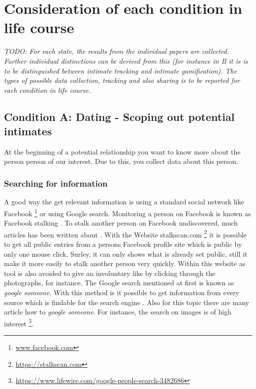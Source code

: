 \section{Consideration of each condition in life course}
\label{sec:consideration_life_course_conditions}

\textit{TODO: For each state, the results from the individual papers are collected.
Further individual distinctions can be derived from this (for instance in B it is is to be distinguished between intimate tracking and intimate gamification).
The types of possible data collection, tracking and also sharing is to be reported for each condition in life course.}

\subsection{Condition A: Dating - Scoping out potential intimates}
\label{subsec:A}
At the beginning of a potential relationship you want to know more about the person person of our interest. Due to this, you collect data about this person. 
\subsubsection{Searching for information}
A good way the get relevant information is using a standard social network like Facebook \footnote{\url{www.facebook.com}} or using Google search. Monitoring a person on Facebook is known as Facebook stalking \cite{levy2014intimate}. To stalk another person on Facebook undiscovered, much articles has been written about \cite{sueddeutsche_fb_stalking}. With the Website stalkscan.com \footnote{\url{https://stalkscan.com}} it is possible to get all public entries from a persons Facebook profile site which is public by only one mouse click. Surley, it can only shows what is already set public, still it make it more easily to stalk another person very quickly.
Within this website as tool is also avoided to give an involuntary like by clicking through the photographs, for instance.
The Google search mentioned at first is known as \textit{google someone}. With this method is it possible to get information from every source which is findable for the search engine \cite{nolan2005hacking}. Also for this topic there are many article how to \textit{google someone}. For instance, the search on images is of high interest \footnote{\url{https://www.lifewire.com/google-people-search-3482686}}.

